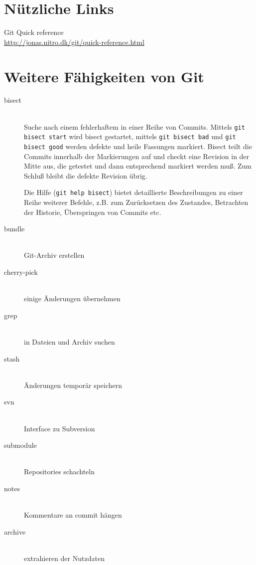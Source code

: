 \documentclass[a4paper, 12pt]{article}
\begin{document}
\vfill
\section*{Nützliche Links}

Git Quick reference\\
\url{http://jonas.nitro.dk/git/quick-reference.html}


\section{Weitere Fähigkeiten von Git}

\begin{description}
  \item[bisect] \hfill \\
  Suche nach einem fehlerhaftem in einer Reihe von Commits. Mittels \texttt{git bisect start} wird bisect gestartet, mittels \texttt{git bisect bad} und \texttt{git bisect good} werden defekte und heile Fassungen markiert. Bisect teilt die Commits innerhalb der Markierungen auf und checkt eine Revision in der Mitte aus, die getestet und dann entsprechend markiert werden muß. Zum Schluß bleibt die defekte Revision übrig.
    
  Die Hilfe (\texttt{git help bisect}) bietet detaillierte Beschreibungen zu einer Reihe weiterer Befehle, z.B. zum Zurücksetzen des Zustandes, Betrachten der Historie, Überspringen von Commits etc.
  \item[bundle] \hfill \\
  Git-Archiv erstellen
  \item[cherry-pick] \hfill \\
  einige Änderungen übernehmen
  
  \item[grep] \hfill \\
  in Dateien und Archiv suchen
  \item[stash] \hfill \\
  Änderungen temporär speichern
  \item[svn] \hfill \\
  Interface zu Subversion

  \item[submodule] \hfill \\
	Repositories schachteln
  \item[notes] \hfill \\
  Kommentare an commit hängen
  \item[archive] \hfill \\
  extrahieren der Nutzdaten

  
  
  
\end{description}
\end{document}
